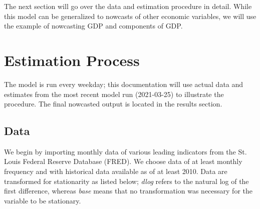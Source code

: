 \documentclass[11pt, letterpaper]{article}\usepackage[]{graphicx}\usepackage[]{color}
\begin{document}
The next section will go over the data and estimation procedure in detail. While this model can be generalized to nowcasts of other economic variables, we will use the example of nowcasting GDP and components of GDP.

\newpage
\section{Estimation Process}
The model is run every weekday; this documentation will use actual data and estimates from the most recent model run (2021-03-25) to illustrate the procedure. The final nowcasted output is located in the results section.

\subsection{Data}
We begin by importing monthly data of various leading indicators from the St. Louis Federal Reserve Database (FRED). We choose data of at least monthly frequency and with historical data available as of at least 2010. Data are transformed for stationarity as listed below; \textit{dlog} refers to the natural log of the first difference, whereas \textit{base} means that no transformation was necessary for the variable to be stationary.
\end{document}
